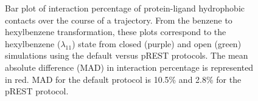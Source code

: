 \documentclass[journal=jctcce,manuscript=article]{achemso}
\begin{document}
\begin{suppinfo}
\setcounter{figure}{0} 
\begin{figure}[!ht]
\begin{subfigure}{\textwidth}
   \centering
\end{subfigure}
\centering
\begin{subfigure}{\textwidth}
  \centering
\end{subfigure}
\label{fig:contactmap}
\caption{Bar plot of interaction percentage of protein-ligand hydrophobic contacts over the course of a trajectory. 
From the benzene to hexylbenzene transformation, these plots correspond to the hexylbenzene ($\lambda_{11}$) state from closed (purple) and open (green) simulations using the default versus pREST protocols.
The mean absolute difference (MAD) in interaction percentage is represented in red.
MAD for the default protocol is 10.5\% and 2.8\% for the pREST protocol.
}
\end{figure}


\end{suppinfo}
\end{document}
